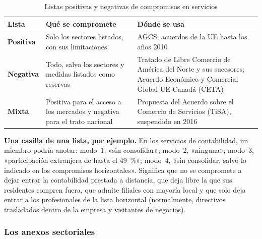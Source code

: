 \documentclass[11pt]{article}
\begin{document}
\begin{table}[H]
\centering
\caption{Listas positivas y negativas de compromisos en servicios}\label{tab:listas}
\small
\begin{tabular}{>{\raggedright\arraybackslash}m{2.6cm}>{\raggedright\arraybackslash}m{5.5cm}>{\raggedright\arraybackslash}m{6.2cm}}
\toprule
\rowcolor{tceeazulpalido} \textbf{Lista} & \textbf{Qué se compromete} & \textbf{Dónde se usa}\\
\midrule
\textcolor{tceemorado}{\textbf{Positiva}} & Solo los sectores listados, con sus limitaciones & AGCS; acuerdos de la UE hasta los años 2010\\
\addlinespace[0.3em]
\textcolor{tceeazul}{\textbf{Negativa}} & Todo, salvo los sectores y medidas listados como reservas & Tratado de Libre Comercio de América del Norte y sus sucesores; Acuerdo Económico y Comercial Global UE-Canadá (CETA)\\
\addlinespace[0.3em]
\textcolor{tceeverde}{\textbf{Mixta}} & Positiva para el acceso a los mercados y negativa para el trato nacional & Propuesta del Acuerdo sobre el Comercio de Servicios (TiSA), suspendido en 2016\\
\bottomrule
\end{tabular}
\end{table}

\begin{anotaciones}
\textbf{Una casilla de una lista, por ejemplo.} En los servicios de contabilidad, un miembro podría anotar: modo~1, «sin consolidar»; modo~2, «ninguna»; modo~3, «participación extranjera de hasta el 49~\%»; modo~4, «sin consolidar, salvo lo indicado en los compromisos horizontales». Significa que no se compromete a dejar entrar la contabilidad prestada a distancia, que deja libre la que sus residentes compren fuera, que admite filiales con mayoría local y que solo deja entrar a los profesionales de la lista horizontal (normalmente, directivos trasladados dentro de la empresa y visitantes de negocios).
\end{anotaciones}

\subsubsection{Los anexos sectoriales}\label{sec:anexos-agcs}
\end{document}
